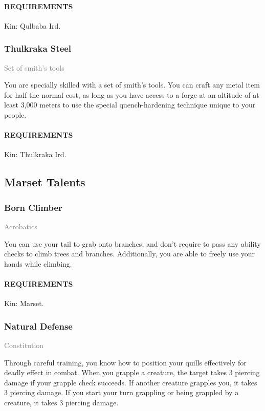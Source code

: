     \paragraph{REQUIREMENTS} Kin: Qulbaba Ird.

    \subsubsection{Thulkraka Steel} \label{tal::thulkrakasteel}
    \small{\textcolor{gray}{Set of smith's tools}}

    \normalsize
    You are specially skilled with a set of smith's tools.
    You can craft any metal item for half the normal cost, as long as you have access to a forge at an altitude of at least 3,000 meters to use the special quench-hardening technique unique to your people.
    \paragraph{REQUIREMENTS} Kin: Thulkraka Ird.

\subsection*{Marset Talents}
    \subsubsection{Born Climber} \label{tal::bornclimber}
    \small{\textcolor{gray}{Acrobatics}}

    \normalsize
    You can use your tail to grab onto branches, and don't require to pass any ability checks to climb trees and branches.
    Additionally, you are able to freely use your hands while climbing.
    \paragraph{REQUIREMENTS} Kin: Marset.

    \subsubsection{Natural Defense} \label{tal::naturaldefense}
    \small{\textcolor{gray}{Constitution}}

    \normalsize
    Through careful training, you know how to position your quills effectively for deadly effect in combat.
    When you grapple a creature, the target takes 3 piercing damage if your grapple check succeeds.
    If another creature grapples you, it takes 3 piercing damage.
    If you start your turn grappling or being grappled by a creature, it takes 3 piercing damage.
